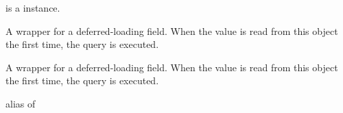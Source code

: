 \documentclass[letterpaper,10pt,english]{sphinxmanual}
\begin{document}
\begin{fulllineitems}
\begin{fulllineitems}
 is a  instance.

\end{fulllineitems}


\begin{fulllineitems}
\label{\detokenize{modules/models:gestion.models.HistoricalPinte.history_user_id}}
A wrapper for a deferred-loading field. When the value is read from this
object the first time, the query is executed.

\end{fulllineitems}


\begin{fulllineitems}
\label{\detokenize{modules/models:gestion.models.HistoricalPinte.id}}
A wrapper for a deferred-loading field. When the value is read from this
object the first time, the query is executed.

\end{fulllineitems}


\begin{fulllineitems}
\label{\detokenize{modules/models:gestion.models.HistoricalPinte.instance}}
\end{fulllineitems}


\begin{fulllineitems}
\label{\detokenize{modules/models:gestion.models.HistoricalPinte.instance_type}}
alias of {\hyperref[\detokenize{modules/models:gestion.models.Pinte}]{}}

\end{fulllineitems}


\end{fulllineitems}
\end{document}
